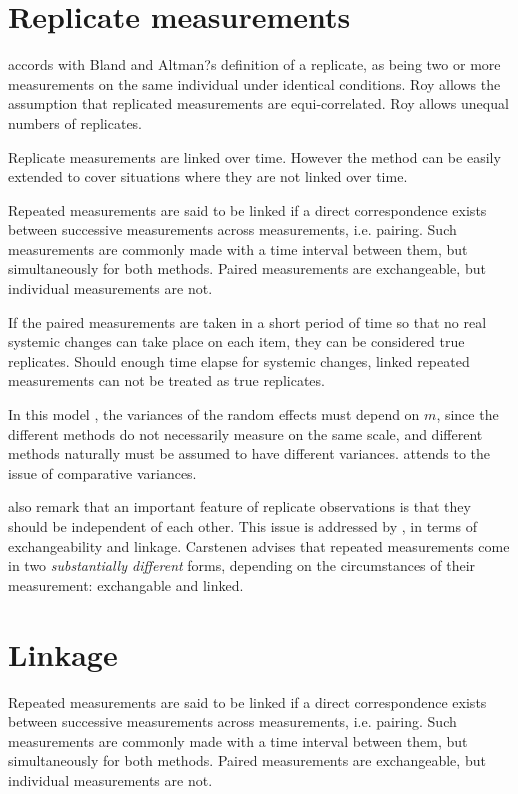 \documentclass[12pt, a4paper]{report}
\theoremstyle{plain}
\theoremstyle{definition}
\theoremstyle{remark}
\begin{document}
	

	\section{Replicate measurements}
	\citet{ARoy2009} accords with Bland and Altman?s definition of a replicate, as being two or more measurements on the same individual under identical conditions.
	Roy allows the assumption that replicated measurements are equi-correlated.
	Roy allows unequal numbers of replicates.

	
	Replicate measurements are linked over time. However the method can be easily extended to cover situations where they are not linked over time.
	
	Repeated measurements are said to be linked if a direct correspondence exists between successive measurements across measurements, i.e. pairing. Such measurements are commonly made with a time interval between them, but simultaneously for both methods. Paired measurements are exchangeable, but individual measurements are not.
	
	If the paired measurements are taken
	in a short period of time so that no real systemic changes can take place on each item, they can be considered true replicates.
	Should enough time elapse for systemic changes, linked repeated measurements can not be treated as true replicates.
	
	
	
	
	In this model , the variances of the random effects must depend on
	$m$, since the different methods do not necessarily measure on the
	same scale, and different methods naturally must be assumed to
	have different variances. \citet{BXC2004} attends to the issue of
	comparative variances.
	

		
	\bigskip
	\citet{BA99} also remark that an important feature of replicate observations is that they should be independent
	of each other. This issue is addressed by \citet{BXC2010}, in terms of exchangeability and linkage. Carstenen advises that repeated measurements come in two \emph{substantially different} forms, depending on the circumstances of their measurement: exchangable and linked.
	\section{Linkage}
	Repeated measurements are said to be linked if a direct correspondence exists between successive measurements across measurements, i.e. pairing. Such measurements are commonly made with a time interval between them, but simultaneously for both methods. Paired measurements are exchangeable, but individual measurements are not.
	
\end{document}
